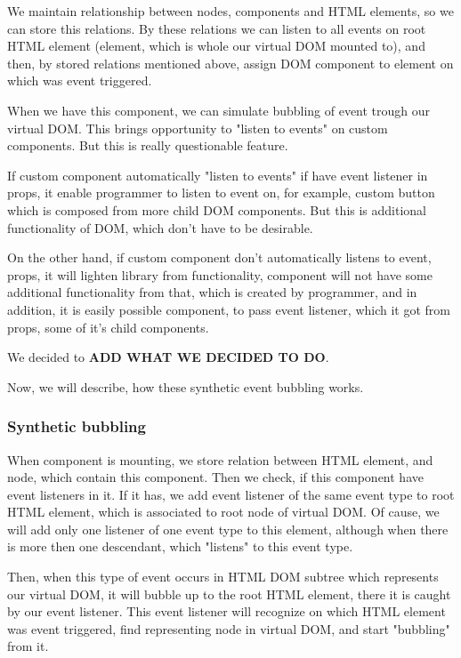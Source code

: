 \documentclass[oneside, 12pt]{book}
\begin{document}
    We maintain relationship between nodes, components and HTML elements, so we can store this relations.
    By these relations we can listen to all events on root HTML element 
    (element, which is whole our virtual DOM mounted to), 
    and then, by stored relations mentioned above, assign DOM component to element on which was event triggered.

    When we have this component, we can simulate bubbling of event trough our virtual DOM. 
    This brings opportunity to "listen to events" on custom components. 
    But this is really questionable feature.

    If custom component automatically "listen to events" if have event listener in props, 
    it enable programmer to listen to event on, for example, custom button which is composed from more child DOM components.
    But this is additional functionality of DOM, which don't have to be desirable. 

    On the other hand, if custom component don't automatically listens to event, props, it will lighten library from functionality, 
    component will not have some additional functionality from that, which is created by programmer, 
    and in addition, it is easily possible component, to pass event listener, which it got from props, some of it's child components.
    
    We decided to \textbf{ADD WHAT WE DECIDED TO DO}.

    Now, we will describe, how these synthetic event bubbling works.

    \subsubsection{Synthetic bubbling}\label{subsec:our-architecture-events-bubbling}

      When component is mounting, we store relation between HTML element, and node, which contain this component. 
      Then we check, if this component have event listeners in it. 
      If it has, we add event listener of the same event type to root HTML element, 
      which is associated to root node of virtual DOM. 
      Of cause, we will add only one listener of one event type to this element, 
      although when there is more then one descendant, which "listens" to this event type.

      Then, when this type of event occurs in HTML DOM subtree which represents our virtual DOM, 
      it will bubble up to the root HTML element, there it is caught by our event listener. 
      This event listener will recognize on which HTML element was event triggered, 
      find representing node in virtual DOM, and start "bubbling" from it.
\end{document}

